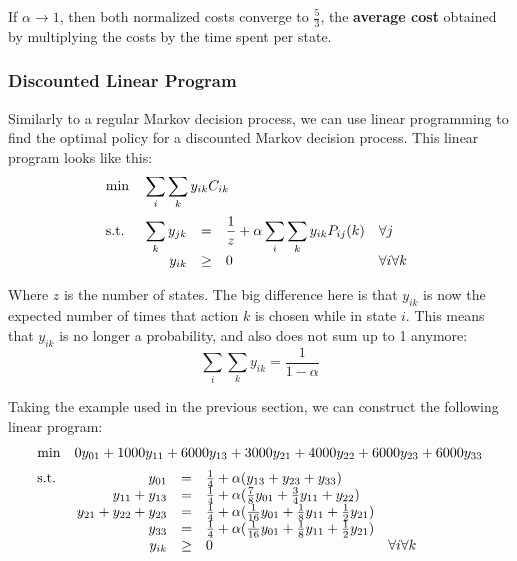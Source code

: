 \documentclass[12pt]{article}
\begin{document}
\noindent
If $\alpha \rightarrow 1$, then both normalized costs converge to $\frac{5}{3}$, the \textbf{average cost} obtained by multiplying the costs by the time spent per state.

\subsubsection{Discounted Linear Program}
Similarly to a regular Markov decision process, we can use linear programming to find the optimal policy for a discounted Markov decision process.
This linear program looks like this:
\begin{align*}
    &\mathrm{min} \quad \sum_{i}\sum_{k} y_{ik} C_{ik} \\[2pt]
    &\mathrm{s.t.} \quad 
    \begin{array}[t]{r c l l}
        \displaystyle\sum_{k} y_{jk} & = & \displaystyle\frac{1}{z} + \alpha \displaystyle\sum_{i}\displaystyle\sum_{k} y_{ik} P_{ij}(k) & \forall j \\
        y_{ik} & \geq & 0 & \forall i \forall k
     \end{array}
\end{align*}

\noindent
Where $z$ is the number of states.
The big difference here is that $y_{ik}$ is now the expected number of times that action $k$ is chosen while in state $i$.
This means that $y_{ik}$ is no longer a probability, and also does not sum up to 1 anymore:
\[ \sum_i \sum_k y_{ik} = \frac{1}{1 - \alpha} \]

\noindent
Taking the example used in the previous section, we can construct the following linear program:
\begin{align*}
    &\mathrm{min} \quad 0y_{01} + 1000y_{11} + 6000y_{13} + 3000y_{21} + 4000y_{22} + 6000y_{23} + 6000y_{33} \\[2pt]
    &\mathrm{s.t.} \quad 
    \begin{array}[t]{r c l l}
        y_{01} & = & \frac{1}{4} + \alpha (y_{13} + y_{23} + y_{33}) & \\
        y_{11} + y_{13} & = & \frac{1}{4} + \alpha (\frac{7}{8}y_{01} + \frac{3}{4}y_{11} + y_{22}) & \\
        y_{21} + y_{22} + y_{23} & = & \frac{1}{4} + \alpha (\frac{1}{16}y_{01} + \frac{1}{8}y_{11} + \frac{1}{2}y_{21}) & \\
        y_{33} & = & \frac{1}{4} + \alpha (\frac{1}{16}y_{01} + \frac{1}{8}y_{11} + \frac{1}{2}y_{21}) & \\
        y_{ik} & \geq & 0 & \forall i \forall k
     \end{array}
\end{align*}
\end{document}
